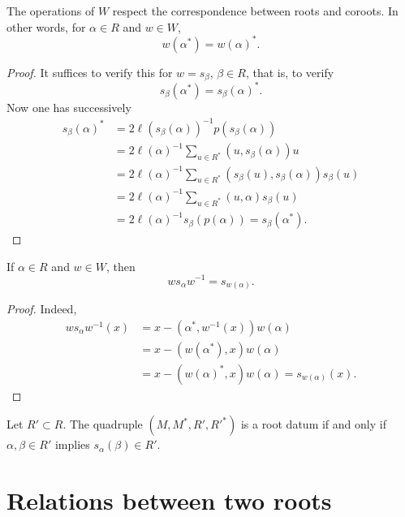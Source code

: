 \begin{proposition}\label{sga3:XXI:1.2.9}
The operations of \(W\) respect the correspondence between roots and
coroots. In other words, for \(\alpha\in R\) and \(w\in W\),
\[
 w(\alpha^\ast)=w(\alpha)^\ast.
\]
\end{proposition}

\begin{proof}
It suffices to verify this for \(w=s_\beta\), \(\beta\in R\), that is,
to verify
\[
 s_\beta(\alpha^\ast)=s_\beta(\alpha)^\ast.
\]
Now one has successively
\begin{align*}
 s_\beta(\alpha)^\ast
 &=2\ell(s_\beta(\alpha))^{-1}p(s_\beta(\alpha))\\
 &=2\ell(\alpha)^{-1}\sum_{u\in R^\ast}(u,s_\beta(\alpha))u\\
 &=2\ell(\alpha)^{-1}\sum_{u\in R^\ast}(s_\beta(u),s_\beta(\alpha))s_\beta(u)\\
 &=2\ell(\alpha)^{-1}\sum_{u\in R^\ast}(u,\alpha)s_\beta(u)\\
 &=2\ell(\alpha)^{-1}s_\beta(p(\alpha))=s_\beta(\alpha^\ast).
\end{align*}
\end{proof}

\begin{corollary}\label{sga3:XXI:1.2.10}
If \(\alpha\in R\) and \(w\in W\), then
\[
 ws_\alpha w^{-1}=s_{w(\alpha)}.
\]
\end{corollary}

\begin{proof}
Indeed,
\begin{align*}
 ws_\alpha w^{-1}(x)
 &=x-(\alpha^\ast,w^{-1}(x))w(\alpha)\\
 &=x-(w(\alpha^\ast),x)w(\alpha)\\
 &=x-(w(\alpha)^\ast,x)w(\alpha)=s_{w(\alpha)}(x).
\end{align*}
\end{proof}

\begin{corollary}\label{sga3:XXI:1.2.11}\leavevmode\par
Let \(R'\subset R\). The quadruple
\((M,M^\ast,R',R'^\ast)\) is a root datum if and only if
\(\alpha,\beta\in R'\) implies \(s_\alpha(\beta)\in R'\).
\end{corollary}

\section{Relations between two roots}

